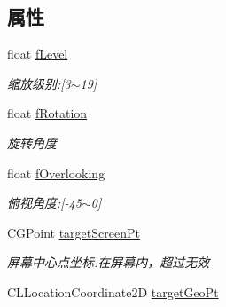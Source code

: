 \subsection*{属性}
\begin{DoxyCompactItemize}
\item 
\hypertarget{interface_b_m_k_map_status_abe3f9d36eee716ca15394aab89e1134c}{}float \hyperlink{interface_b_m_k_map_status_abe3f9d36eee716ca15394aab89e1134c}{f\+Level}\label{interface_b_m_k_map_status_abe3f9d36eee716ca15394aab89e1134c}

\begin{DoxyCompactList}\small\item\em 缩放级别\+:\mbox{[}3$\sim$19\mbox{]} \end{DoxyCompactList}\item 
\hypertarget{interface_b_m_k_map_status_a3c22c82aead710c2dec187ff1d39e370}{}float \hyperlink{interface_b_m_k_map_status_a3c22c82aead710c2dec187ff1d39e370}{f\+Rotation}\label{interface_b_m_k_map_status_a3c22c82aead710c2dec187ff1d39e370}

\begin{DoxyCompactList}\small\item\em 旋转角度 \end{DoxyCompactList}\item 
\hypertarget{interface_b_m_k_map_status_abd88f1cfbe5a8bbf2503c51802bf5c96}{}float \hyperlink{interface_b_m_k_map_status_abd88f1cfbe5a8bbf2503c51802bf5c96}{f\+Overlooking}\label{interface_b_m_k_map_status_abd88f1cfbe5a8bbf2503c51802bf5c96}

\begin{DoxyCompactList}\small\item\em 俯视角度\+:\mbox{[}-\/45$\sim$0\mbox{]} \end{DoxyCompactList}\item 
\hypertarget{interface_b_m_k_map_status_a902555f3b28504a2217443c496edc491}{}C\+G\+Point \hyperlink{interface_b_m_k_map_status_a902555f3b28504a2217443c496edc491}{target\+Screen\+Pt}\label{interface_b_m_k_map_status_a902555f3b28504a2217443c496edc491}

\begin{DoxyCompactList}\small\item\em 屏幕中心点坐标\+:在屏幕内，超过无效 \end{DoxyCompactList}\item 
\hypertarget{interface_b_m_k_map_status_a98d10950c91d08dce079020baafbe10d}{}C\+L\+Location\+Coordinate2\+D \hyperlink{interface_b_m_k_map_status_a98d10950c91d08dce079020baafbe10d}{target\+Geo\+Pt}\label{interface_b_m_k_map_status_a98d10950c91d08dce079020baafbe10d}


\end{DoxyCompactItemize}
